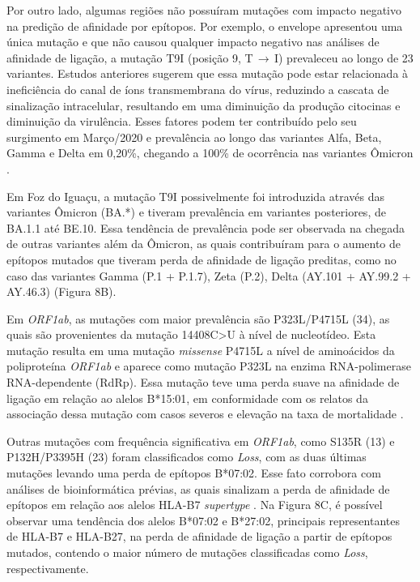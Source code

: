\begin{justifying}
\begin{figure}
\end{figure}

\vspace{10mm}

Por outro lado, algumas regiões não possuíram mutações com impacto negativo na predição de afinidade por epítopos. Por exemplo, o envelope apresentou uma única mutação e que não causou qualquer impacto negativo nas análises de afinidade de ligação,  a mutação T9I (posição 9, T$\,\to\,$I) prevaleceu ao longo de 23 variantes. Estudos anteriores sugerem que essa mutação pode estar relacionada à ineficiência do canal de íons transmembrana do vírus, reduzindo a cascata de sinalização intracelular,  resultando em uma diminuição da produção citocinas e diminuição da virulência. Esses fatores podem ter contribuído pelo seu surgimento em Março/2020 e prevalência ao longo das variantes Alfa, Beta, Gamma e Delta em 0,20\%, chegando a 100\% de ocorrência nas variantes Ômicron \cite{Xia:2022}.

Em Foz do Iguaçu, a mutação T9I possivelmente foi introduzida através das variantes Ômicron (BA.*) e tiveram prevalência em variantes posteriores, de BA.1.1 até BE.10. Essa tendência de prevalência pode ser observada na chegada de outras variantes além da Ômicron, as quais contribuíram para o aumento de epítopos mutados que tiveram perda de afinidade de ligação preditas, como no caso das variantes Gamma (P.1 + P.1.7), Zeta (P.2), Delta (AY.101 + AY.99.2 + AY.46.3) (Figura 8B).

Em \textit{ORF1ab}, as mutações com maior prevalência são P323L/P4715L (34), as quais são provenientes da mutação 14408C\textgreater U à nível de nucleotídeo. Esta mutação resulta em uma mutação \textit{missense} P4715L a nível de aminoácidos da poliproteína \textit{ORF1ab} e aparece como mutação P323L na enzima RNA-polimerase RNA-dependente (RdRp). Essa mutação teve uma perda suave na afinidade de ligação em relação ao alelos B*15:01, em conformidade com os relatos da associação dessa mutação com casos severos e elevação na taxa de mortalidade \cite{Toyoshima:2020}.

Outras mutações com frequência significativa em \textit{ORF1ab}, como S135R (13) e P132H/P3395H (23) foram classificados como \textit{Loss}, com as duas últimas mutações levando uma perda de epítopos B*07:02. Esse fato corrobora com análises de bioinformática prévias, as quais sinalizam a perda  de afinidade de epítopos em relação aos alelos HLA-B7 \textit{supertype} \cite{Hamelin:2022}. Na Figura 8C, é possível observar uma tendência dos alelos B*07:02 e B*27:02, principais representantes de HLA-B7 e HLA-B27, na perda de afinidade de ligação a partir de epítopos mutados, contendo o maior número de mutações classificadas como \textit{Loss}, respectivamente.


\end{justifying}
